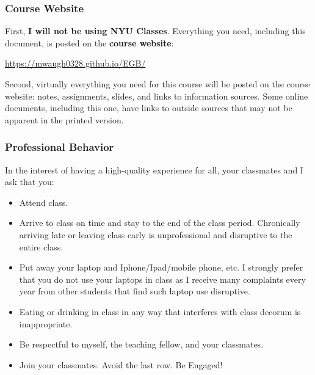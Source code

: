 \documentclass[12pt,pdftex,twoside,letterpaper]{exam}
\begin{document}
\subsubsection*{Course Website}
First, \textbf{I will not be using NYU Classes}. Everything you need, including this document, is posted on
the {\bf course website\/}:
%
\vspace{-0.15in}
\begin{center}
\url{https://mwaugh0328.github.io/EGB/}
\end{center}

Second, virtually everything you need for this course will be posted on the course website: notes, assignments, slides, and links to information sources. Some online documents, including this one, have links to outside sources that may not be apparent in the printed version.

\subsubsection*{Professional Behavior}
In the interest of having a high-quality experience for all,
your classmates and I ask that you:
\begin{itemize}
\item Attend class.

\item Arrive to class on time and stay to the end of the class period. Chronically arriving late or leaving class early is unprofessional and disruptive to the entire class.

\item Put away your laptop and Iphone/Ipad/mobile phone, etc. I strongly prefer that you do not use your laptops in class as I receive many complaints every year from other students that find such laptop use disruptive.

\item Eating or drinking in class in any way that interferes with class decorum is inappropriate.

\item Be respectful to myself, the teaching fellow, and your classmates.

\item Join your classmates. Avoid the last row. Be Engaged!
\end{itemize}
\end{document}
